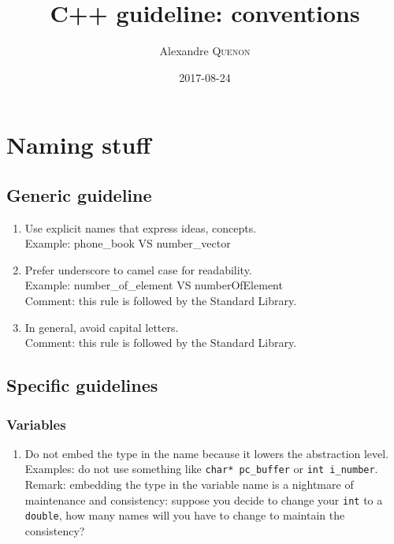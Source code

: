 \documentclass[a4paper,11pt]{scrbook}
\author{Alexandre \textsc{Quenon}}
\date{2017-08-24}%
\title{C++ guideline: conventions}
\begin{document}
\frontmatter
\maketitle

\tableofcontents


\mainmatter
\chapter{Naming stuff}


\section{Generic guideline}


	\begin{enumerate}
		\item Use explicit names that express ideas, concepts.\\
			Example: phone\_book VS number\_vector
		\item Prefer underscore to camel case for readability.\\
			Example: number\_of\_element VS numberOfElement\\
			Comment: this rule is followed by the Standard Library.
		\item In general, avoid capital letters.\\
			Comment: this rule is followed by the Standard Library.
	\end{enumerate}


\section{Specific guidelines}


	\subsection{Variables}
	
		\begin{enumerate}
			\item Do not embed the type in the name because it lowers the abstraction level.\\
			Examples: do not use something like \verb|char* pc_buffer| or \verb|int i_number|.\\
			Remark: embedding the type in the variable name is a nightmare of maintenance and consistency: suppose you decide to change your \verb|int| to a \verb|double|, how many names will you have to change to maintain the consistency?
		\end{enumerate}
\end{document}
